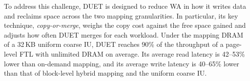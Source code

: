 To address this challenge, DUET is designed to reduce WA in how it writes data and reclaims space across the two mapping granularities. In particular, its key technique, \emph{copy-or-merge}, weighs the copy cost against
the free space gained and adjusts how often DUET merges for each workload.
Under the mapping DRAM of a 32\,KB uniform coarse IU, DUET reaches
90\% of the throughput of a page-level FTL with unlimited DRAM on average. Its average
read latency is 42--53\% lower than on-demand mapping, and its average write
latency is 40--65\% lower than that of block-level hybrid mapping and the uniform
coarse IU.
